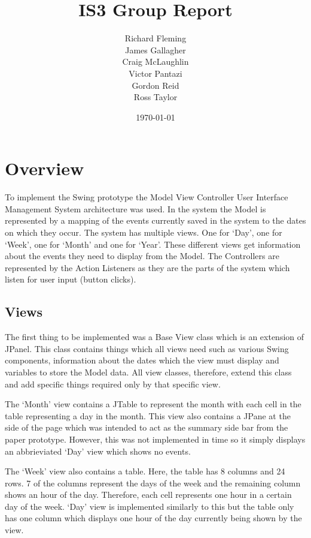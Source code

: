 \documentclass{article}
\title{IS3 Group Report}
\author{
  Richard Fleming \\
  James Gallagher \\
  Craig McLaughlin \\
  Victor Pantazi \\  
  Gordon Reid \\
  Ross Taylor}
\date{\today}
\begin{document}

\maketitle


\section{Overview}

To implement the Swing prototype the Model View Controller User
Interface Management System architecture was used. In the system the
Model is represented by a mapping of the events currently saved in the
system to the dates on which they occur. The system has multiple views.
One for `Day', one for `Week', one for `Month' and one for `Year'. These
different views get information about the events they need to display
from the Model. The Controllers are represented by the Action Listeners
as they are the parts of the system which listen for user input (button
clicks).

\subsection{Views}

The first thing to be implemented was a Base View class which is an
extension of JPanel. This class contains things which all views need
such as various Swing components, information about the dates which
the view must display and variables to store the Model data. All view
classes, therefore, extend this class and add specific things required
only by that specific view.

The `Month' view contains a JTable to represent the month with each cell
in the table representing a day in the month. This view also contains a
JPane at the side of the page which was intended to act as the summary
side bar from the paper prototype. However, this was not implemented in
time so it simply displays an abbrieviated `Day' view which shows no
events.

The `Week' view also contains a table. Here, the table has 8 columns and
24 rows. 7 of the columns represent the days of the week and the
remaining column shows an hour of the day. Therefore, each cell
represents one hour in a certain day of the week. `Day' view is
implemented similarly to this but the table only has one column which
displays one hour of the day currently being shown by the view.
\end{document}

